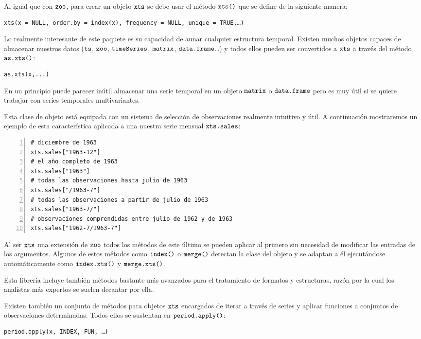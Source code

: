 Al igual que con $\verb!zoo!$, para crear un objeto $\verb!xts!$ se debe usar el método $\verb!xts()!$ que se define de la siguiente manera:
\begin{Verbatim}[fontsize=\footnotesize]
xts(x = NULL, order.by = index(x), frequency = NULL, unique = TRUE,…)
\end{Verbatim}

Lo realmente interesante de este paquete es su capacidad de aunar cualquier estructura temporal. Existen muchos objetos capaces de almacenar nuestros datos ($\verb!ts!$, $\verb!zoo!$, $\verb!timeSeries!$, $\verb!matrix!$, $\verb!data.frame!$…) y todos ellos pueden ser convertidos a $\verb!xts!$ a través del método $\verb!as.xts()!$:
\begin{Verbatim}[fontsize=\footnotesize]
as.xts(x,...)
\end{Verbatim}

En un principio puede parecer inútil almacenar una serie temporal en un objeto $\verb!matrix!$ o $\verb!data.frame!$ pero es muy útil si se quiere trabajar con series temporales multivariantes.

Esta clase de objeto está equipada con un sistema de selección de observaciones realmente intuitivo y útil. A continuación mostraremos un ejemplo de esta característica aplicada a una nuestra serie mensual $\verb!xts.sales!$:
\begin{Verbatim}[fontsize=\footnotesize, numbers = left]
# diciembre de 1963
xts.sales["1963-12"]
# el año completo de 1963
xts.sales["1963"]
# todas las observaciones hasta julio de 1963
xts.sales["/1963-7"]
# todas las observaciones a partir de julio de 1963
xts.sales["1963-7/"]
# observaciones comprendidas entre julio de 1962 y de 1963
xts.sales["1962-7/1963-7"]
\end{Verbatim}

Al ser $\verb!xts!$ una extensión de $\verb!zoo!$ todos los métodos de este último se pueden aplicar al primero sin necesidad de modificar las entradas de los argumentos. Algunos de estos métodos como $\verb!index()!$ o $\verb!merge()!$ detectan la clase del objeto y se adaptan a él ejecutándose automáticamente como $\verb!index.xts()!$ y $\verb!merge.xts()!$.

Esta librería incluye también métodos bastante más avanzados para el tratamiento de formatos y estructuras, razón por la cual los analistas más expertos se suelen decantar por ella.

Existen también un conjunto de métodos para objetos $\verb!xts!$ encargados de iterar a través de series y aplicar funciones a conjuntos de observaciones determinadas. Todos ellos se sustentan en $\verb!period.apply()!$:
\begin{Verbatim}[fontsize=\footnotesize]
period.apply(x, INDEX, FUN, …)
\end{Verbatim}

